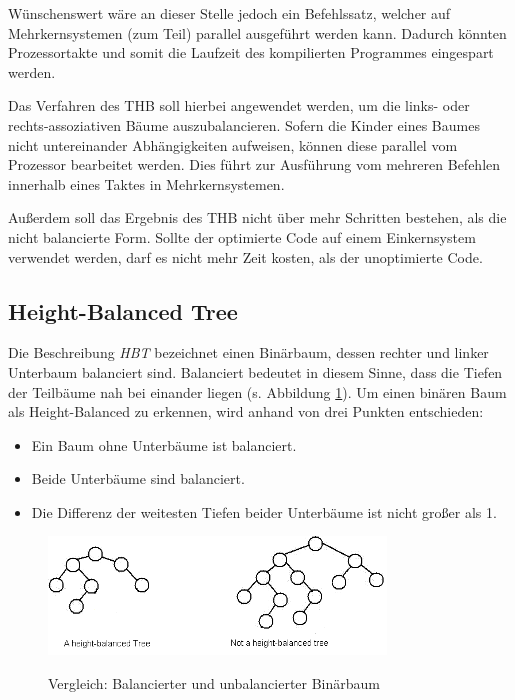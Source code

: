 Wünschenswert wäre an dieser Stelle jedoch ein Befehlssatz, welcher auf Mehrkernsystemen (zum Teil) parallel ausgeführt werden kann. Dadurch könnten Prozessortakte und somit die Laufzeit des kompilierten Programmes eingespart werden.

Das Verfahren des \ac{THB} soll hierbei angewendet werden, um die links- oder rechts-assoziativen Bäume auszubalancieren. Sofern die Kinder eines Baumes nicht untereinander Abhängigkeiten aufweisen, können diese parallel vom Prozessor bearbeitet werden. Dies führt zur Ausführung vom mehreren Befehlen innerhalb eines Taktes in Mehrkernsystemen.

Außerdem soll das Ergebnis des \ac{THB} nicht über mehr Schritten bestehen, als die nicht balancierte Form. Sollte der optimierte Code auf einem Einkernsystem verwendet werden, darf es nicht mehr Zeit kosten, als der unoptimierte Code.


\subsection{Height-Balanced Tree}
Die Beschreibung \textit{\ac{HBT}} bezeichnet einen Binärbaum, dessen rechter und linker Unterbaum balanciert sind. Balanciert bedeutet in diesem Sinne, dass die Tiefen der Teilbäume nah bei einander liegen (s. Abbildung \ref{fig:vgl-hbt}\cite{geeks}).\cite{hbt}
Um einen binären Baum als Height-Balanced zu erkennen, wird anhand von drei Punkten entschieden:

\begin{itemize} 
	\item Ein Baum ohne Unterbäume ist balanciert.
	\item Beide Unterbäume sind balanciert. 
	\item Die Differenz der weitesten Tiefen beider Unterbäume ist nicht großer als 1. 
\end{itemize}

\begin{figure}
	\begin{center}
		\includegraphics[width=0.8\textwidth]{images/balanced_tree}\\
	\end{center}
	\caption{Vergleich: Balancierter und unbalancierter Binärbaum}
	\label{fig:vgl-hbt}
\end{figure}


